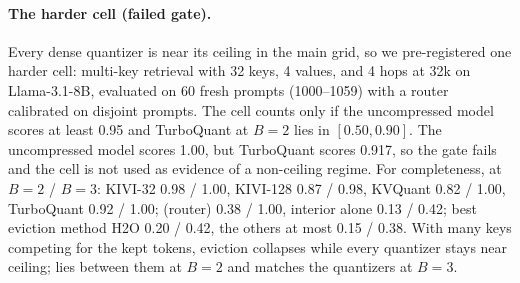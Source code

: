 \paragraph{The harder cell (failed gate).}
Every dense quantizer is near its ceiling in the main grid, so we pre-registered
one harder cell: multi-key retrieval with 32 keys, 4 values, and 4 hops at 32k on
Llama-3.1-8B, evaluated on 60 fresh prompts (1000--1059) with a router calibrated
on disjoint prompts.  The cell counts only if the uncompressed model scores at
least 0.95 and TurboQuant at $B=2$ lies in $[0.50,0.90]$.  The uncompressed model
scores 1.00, but TurboQuant scores 0.917, so the gate fails and the cell is not
used as evidence of a non-ceiling regime.  For completeness, at $B=2$ / $B=3$:
KIVI-32 0.98 / 1.00, KIVI-128 0.87 / 0.98, KVQuant 0.82 / 1.00, TurboQuant
0.92 / 1.00; \sieve{} (router) 0.38 / 1.00, interior alone 0.13 / 0.42; best
eviction method H2O 0.20 / 0.42, the others at most 0.15 / 0.38.  With many keys
competing for the kept tokens, eviction collapses while every quantizer stays
near ceiling; \sieve{} lies between them at $B=2$ and matches the quantizers at
$B=3$.

\begin{table}[h]
\centering
\small
\caption{\sieve{} (router) against each baseline over the 36 valid cells.  A win or loss is a cell-mean difference above 0.15, the 90th percentile of the run-to-run spread (App.~\ref{app:compute}); the interval resamples prompts within each model and context.}
\label{tab:app-h2h}

\end{table}

\begin{table}[h]
\centering
\scriptsize
\setlength{\tabcolsep}{3pt}
\caption{Failure case: Llama-3.1-8B at 128k.  Error types are over single- and multi-key answers at $B\in\{2,3\}$ (80 per method).  \emph{Truncated}: the prediction keeps the correct first three digits (Llama's first number token) but is not the correct number; proper prefixes alone account for 22\% (interior and router), 39\% (H2O), and at most 4\% (pooled eviction methods).  Diagnostic rows are not tuned methods.  \emph{Wrong needle}: another needle's value.}
\label{tab:app-fail}

\end{table}

\begin{table}[h]
\centering
\scriptsize
\setlength{\tabcolsep}{2.4pt}
\caption{Paired end-task grid: mean score over 20 prompts per cell, all methods in one process per cell.  Bold marks the best method in each valid row.  $\ddagger$: uncompressed score below 0.9, excluded from every aggregate.  Mistral-7B rows are summarized separately in Table~\ref{tab:endtask}.}
\label{tab:app-grid}
\resizebox{\linewidth}{!}{}
\end{table}



